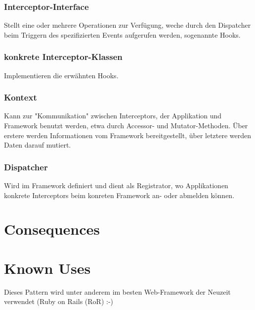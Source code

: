 \subsubsection{Interceptor-Interface}
Stellt eine oder mehrere Operationen zur Verfügung, weche durch den Dispatcher beim Triggern des spezifizierten Events aufgerufen werden, sogenannte Hooks.
\subsubsection{konkrete Interceptor-Klassen}
Implementieren die erwähnten Hooks.
\subsubsection{Kontext}
Kann zur "Kommunikation" zwischen Interceptors, der Applikation und Framework benutzt werden, etwa durch Accessor- und Mutator-Methoden. Über erstere werden Informationen vom Framework bereitgestellt, über letztere werden Daten darauf mutiert.
\subsubsection{Dispatcher}
Wird im Framework definiert und dient als Registrator, wo Applikationen konkrete Interceptors beim konreten Framework an- oder abmelden können.


\section{Consequences}
\begin{itemize}
\end{itemize}

\section{Known Uses}
Dieses Pattern wird unter anderem im besten Web-Framework der Neuzeit verwendet (Ruby on Rails (RoR) :-)

